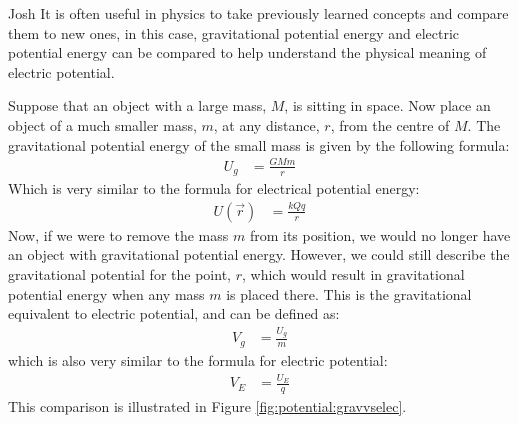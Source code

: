 \begin{studentOpinion}{Josh}
It is often useful in physics to take previously learned concepts and compare them to new ones, in this case, gravitational potential energy and electric potential energy can be compared to help understand the physical meaning of electric potential. 
	
Suppose that an object with a large mass, $M$, is sitting in space. Now place an object of a much smaller mass, $m$, at any distance, $r$, from the centre of $M$. The gravitational potential energy of the small mass is given by the following formula:
\begin{align*}
U_g&=\frac{GMm}{r}
\end{align*}
Which is very similar to the formula for electrical potential energy:
\begin{align*}
U(\vec r)&=\frac{kQq}{r}
\end{align*}	
Now, if we were to remove the mass $m$ from its position, we would no longer have an object with gravitational potential energy. However, we could still describe the gravitational potential for the point, $r$, which would result in gravitational potential energy when any mass $m$ is placed there. This is the gravitational equivalent to electric potential, and can be defined as:
\begin{align*}
V_g&=\frac{U_g}{m}
\end{align*}
which is also very similar to the formula for electric potential:
\begin{align*}
V_E&=\frac{U_E}{q}
\end{align*}
This comparison is illustrated in Figure \ref{fig:potential:gravvselec}.
\end{studentOpinion}

